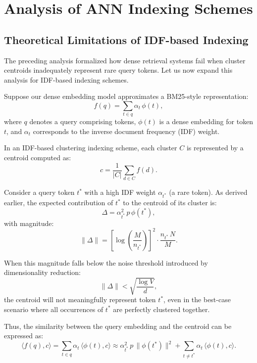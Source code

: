 \documentclass[sigconf,review]{acmart}
\begin{document}
\section{Analysis of ANN Indexing Schemes}

\subsection{Theoretical Limitations of IDF-based Indexing}
The preceding analysis formalized how dense retrieval systems fail when cluster centroids inadequately represent rare query tokens. Let us now expand this analysis for IDF-based indexing schemes.

Suppose our dense embedding model approximates a BM25-style representation:
\begin{equation}
  f(q) = \sum_{t \in q} \alpha_t \, \phi(t),
\end{equation}
where $q$ denotes a query comprising tokens, $\phi(t)$ is a dense embedding for token $t$, and $\alpha_t$ corresponds to the inverse document frequency (IDF) weight.

In an IDF-based clustering indexing scheme, each cluster $C$ is represented by a centroid computed as:
\begin{equation}
  c = \frac{1}{|C|} \sum_{d \in C} f(d).
\end{equation}

Consider a query token $t^*$ with a high IDF weight $\alpha_{t^*}$ (a rare token). As derived earlier, the expected contribution of $t^*$ to the centroid of its cluster is:
\begin{equation}
  \Delta = \alpha_{t^*}^2\, p\, \phi(t^*),
\end{equation}
with magnitude:
\begin{equation}
  \|\Delta\| = \left[\log\!\left(\frac{M}{n_{t^*}}\right)\right]^2 \cdot \frac{n_{t^*}\, N}{M}.
\end{equation}

When this magnitude falls below the noise threshold introduced by dimensionality reduction:
\begin{equation}
  \|\Delta\| < \sqrt{\frac{\log V}{d}},
\end{equation}
the centroid will not meaningfully represent token $t^*$, even in the best-case scenario where all occurrences of $t^*$ are perfectly clustered together.

Thus, the similarity between the query embedding and the centroid can be expressed as:
\begin{equation}
  \langle f(q), c \rangle
  = \sum_{t \in q} \alpha_t \, \langle \phi(t), c \rangle
  \approx \alpha_{t^*}^2 \, p \, \|\phi(t^*)\|^2 + \sum_{t \neq t^*} \alpha_t \, \langle \phi(t), c \rangle.
\end{equation}
\end{document}
